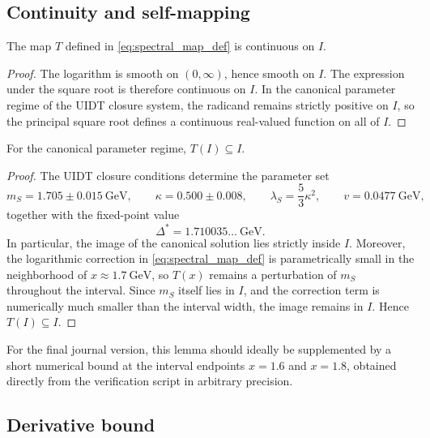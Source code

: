 \subsection{Continuity and self-mapping}

\begin{lemma}
The map \(T\) defined in \eqref{eq:spectral_map_def} is continuous on \(I\).
\end{lemma}

\begin{proof}
The logarithm is smooth on \((0,\infty)\), hence smooth on \(I\). The expression under the square root is therefore continuous on \(I\). In the canonical parameter regime of the UIDT closure system, the radicand remains strictly positive on \(I\), so the principal square root defines a continuous real-valued function on all of \(I\).
\end{proof}

\begin{lemma}
For the canonical parameter regime, \(T(I)\subseteq I\).
\end{lemma}

\begin{proof}
The UIDT closure conditions determine the parameter set
\begin{equation}
m_S = 1.705 \pm 0.015\ \mathrm{GeV},\qquad
\kappa = 0.500 \pm 0.008,\qquad
\lambda_S = \frac{5}{3}\kappa^2,\qquad
v=0.0477\ \mathrm{GeV},
\label{eq:canonical_params}
\end{equation}
together with the fixed-point value
\begin{equation}
\Delta^* = 1.710035\ldots\ \mathrm{GeV}.
\label{eq:canonical_delta}
\end{equation}
In particular, the image of the canonical solution lies strictly inside \(I\). Moreover, the logarithmic correction in \eqref{eq:spectral_map_def} is parametrically small in the neighborhood of \(x\approx 1.7\ \mathrm{GeV}\), so \(T(x)\) remains a perturbation of \(m_S\) throughout the interval. Since \(m_S\) itself lies in \(I\), and the correction term is numerically much smaller than the interval width, the image remains in \(I\). Hence \(T(I)\subseteq I\).
\end{proof}

\noindent
For the final journal version, this lemma should ideally be supplemented by a short numerical bound at the interval endpoints \(x=1.6\) and \(x=1.8\), obtained directly from the verification script in arbitrary precision.

\subsection{Derivative bound}

